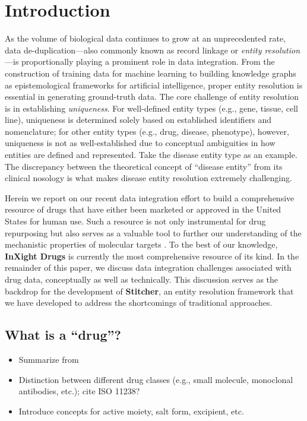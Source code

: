 \documentclass{bioinfo}
\newcommand\st{\textbf{Stitcher}}
\newcommand\ix{\textbf{InXight Drugs}}
\begin{document}
\section{Introduction}
As the volume of biological data continues to grow at an unprecedented rate, data de-duplication---also commonly known as record linkage or \emph{entity resolution}---is proportionally playing a prominent role in data integration. From the construction of training data for machine learning to building knowledge graphs as epistemological frameworks for artificial intelligence, proper entity resolution is essential in generating ground-truth data. The core challenge of entity resolution is in establishing \emph{uniqueness}. For well-defined entity types (e.g., gene, tissue, cell line), uniqueness is determined solely based on established identifiers and nomenclature; for other entity types (e.g., drug, disease, phenotype), however, uniqueness is not as well-established due to conceptual ambiguities in how entities are defined and represented. Take the disease entity type as an example. The discrepancy between the theoretical concept of ``disease entity'' from its clinical nosology \citep{Hucklenbroich14} is what makes disease entity resolution extremely challenging.

Herein we report on our recent data integration effort to build a comprehensive resource of drugs that have either been marketed or approved in the United States for human use. Such a resource is not only instrumental for drug repurposing but also serves as a valuable tool to further our understanding of the mechanistic properties of molecular targets \citep{Huang2019}. To the best of our knowledge, \ix{} is currently the most comprehensive resource of its kind. In the remainder of this paper, we discuss data integration challenges associated with drug data, conceptually as well as technically. This discussion serves as the backdrop for the development of \st, an entity resolution framework that we have developed to address the shortcomings of traditional approaches.

\subsection{What is a ``drug''?}
\begin{itemize}
\item Summarize from \citep{Huang2011}
\item Distinction between different drug classes (e.g., small molecule, monoclonal antibodies, etc.); cite ISO 11238?
\item Introduce concepts for active moiety, salt form, excipient, etc.
\end{itemize}
\end{document}
